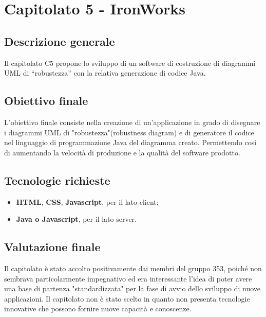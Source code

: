 \documentclass[main.tex]{subfiles}
\begin{document}
\chapter{Capitolato 5 - IronWorks}
\section{Descrizione generale}
Il capitolato C5 propone lo sviluppo di un software
di costruzione di diagrammi UML di “robustezza” con la relativa generazione di codice Java.
\section{Obiettivo finale}
L'obiettivo finale consiste nella creazione di un'applicazione in grado di disegnare i diagrammi UML di "robustezza"(robustness diagram) e di generatore il codice nel linguaggio di programmazione Java del diagramma creato. Permettendo cosi di aumentando la velocità di produzione e la qualità del software prodotto.
\section{Tecnologie richieste}
\begin{itemize}
	\item \textbf{HTML}, \textbf{CSS}, \textbf{Javascript}, per il lato client;
	\item \textbf{Java o Javascript}, per il lato server.
\end{itemize}
\section{Valutazione finale}
Il capitolato è stato accolto positivamente dai membri del gruppo 353, poiché non sembrava particolarmente impegnativo ed era interessante l'idea di poter avere una base di partenza "standardizzata" per la fase di avvio dello sviluppo di nuove applicazioni. Il capitolato non è stato scelto in quanto non presenta tecnologie innovative che possono fornire nuove capacità e conoscenze.
\end{document}

